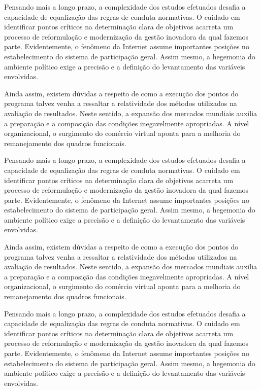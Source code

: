 \documentclass[fleqn]{profmat-cefet}
\begin{document}
Pensando mais a longo prazo, a complexidade dos estudos efetuados desafia a
capacidade de equalização das regras de conduta normativas. O cuidado em
identificar pontos críticos na determinação clara de objetivos acarreta um
processo de reformulação e modernização da gestão inovadora da qual fazemos
parte. Evidentemente, o fenômeno da Internet assume importantes posições no
estabelecimento do sistema de participação geral. Assim mesmo, a hegemonia do
ambiente político exige a precisão e a definição do levantamento das variáveis
envolvidas. 

Ainda assim, existem dúvidas a respeito de como a execução dos pontos do
programa talvez venha a ressaltar a relatividade dos métodos utilizados na
avaliação de resultados. Neste sentido, a expansão dos mercados mundiais auxilia
a preparação e a composição das condições inegavelmente apropriadas. A nível
organizacional, o surgimento do comércio virtual aponta para a melhoria do
remanejamento dos quadros funcionais. 

Pensando mais a longo prazo, a complexidade dos estudos efetuados desafia a
capacidade de equalização das regras de conduta normativas. O cuidado em
identificar pontos críticos na determinação clara de objetivos acarreta um
processo de reformulação e modernização da gestão inovadora da qual fazemos
parte. Evidentemente, o fenômeno da Internet assume importantes posições no
estabelecimento do sistema de participação geral. Assim mesmo, a hegemonia do
ambiente político exige a precisão e a definição do levantamento das variáveis
envolvidas. 

Ainda assim, existem dúvidas a respeito de como a execução dos pontos do
programa talvez venha a ressaltar a relatividade dos métodos utilizados na
avaliação de resultados. Neste sentido, a expansão dos mercados mundiais auxilia
a preparação e a composição das condições inegavelmente apropriadas. A nível
organizacional, o surgimento do comércio virtual aponta para a melhoria do
remanejamento dos quadros funcionais. 

Pensando mais a longo prazo, a complexidade dos estudos efetuados desafia a
capacidade de equalização das regras de conduta normativas. O cuidado em
identificar pontos críticos na determinação clara de objetivos acarreta um
processo de reformulação e modernização da gestão inovadora da qual fazemos
parte. Evidentemente, o fenômeno da Internet assume importantes posições no
estabelecimento do sistema de participação geral. Assim mesmo, a hegemonia do
ambiente político exige a precisão e a definição do levantamento das variáveis
envolvidas. 

\end{document}
